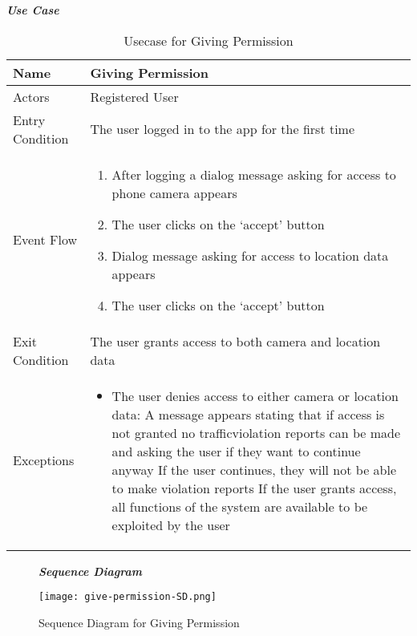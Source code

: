\begin{table}[H]
\begin{flushleft}\emph{\textbf{Use Case}}\end{flushleft}
\footnotesize
\centering
\settowidth{}
\setlength\extrarowheight{2pt}
\begin{tabulary}{\textwidth}{|J|J|}
\hline
Name            & Giving Permission \\
\hline 
Actors          & Registered User \\
\hline 
Entry Condition & The user logged in to the app for the first time \\
\hline 
Event Flow      & 
\begin{minipage}[t]{0.7\textwidth}
\begin{enumerate} 
\item After logging a dialog message asking for access to phone camera appears
\item The user clicks on the ‘accept’ button
\item Dialog message asking for access to location data appears
\item The user clicks on the ‘accept’ button
\end{enumerate}
\end{minipage}\\
\hline

Exit Condition  & The user grants access to both camera and location data \\
\hline 
Exceptions      & 
\begin{minipage}[t]{0.8\textwidth}
\begin{itemize} 
\item The user denies access to either camera or location data: A message appears stating that if access is not granted no trafficviolation reports can be made and asking the user if they want to continue anyway If the user continues, they will not be able to make violation reports If the user grants access, all functions of the system are available to be exploited by the user
\end{itemize}
\end{minipage}\\
\hline
\end{tabulary}
\caption{\label{tab:Usecase-Give-Permission}Usecase for Giving Permission}
\end{table}



\begin{figure}[H]
\begin{flushleft}\emph{\textbf{Sequence Diagram}}\end{flushleft}
\caption{Sequence Diagram for Giving Permission}
\label{fig:SD-Give-Permission}
\centering
\texttt{[image: give-permission-SD.png]}
\end{figure}

